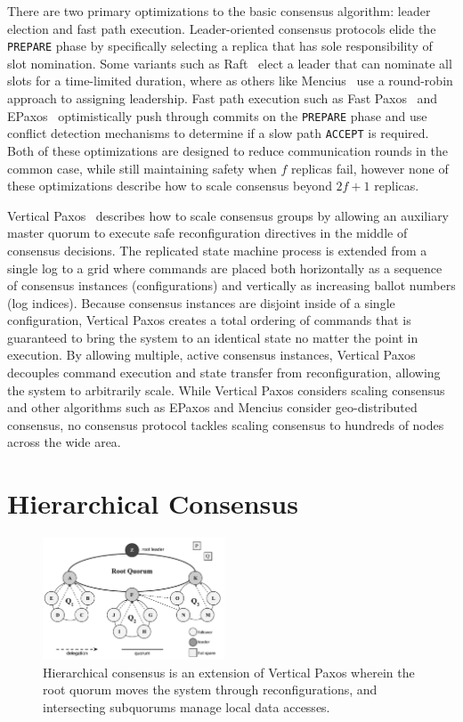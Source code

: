 \documentclass[10pt,conference]{IEEEtran}
\newcommand{\Hc}{Hierarchical consensus\xspace}
\newcommand{\sub}{subquorum\xspace}
\newcommand{\subs}{subquorums\xspace}
\newcommand{\roo}{root quorum\xspace}
\begin{document}
There are two primary optimizations to the basic consensus algorithm: leader election
and fast path execution.
Leader-oriented consensus protocols elide the \texttt{PREPARE} phase by specifically
selecting a replica that has sole responsibility of slot nomination.
Some variants such as Raft~\cite{raft} elect a leader that can nominate all slots for
a time-limited duration, where as others like Mencius~\cite{mencius} use a round-robin
approach to assigning leadership.
Fast path execution such as Fast Paxos~\cite{fast_paxos} and EPaxos~\cite{epaxos}
optimistically push through commits on the \texttt{PREPARE} phase and use conflict
detection mechanisms to determine if a slow path \texttt{ACCEPT} is required.
Both of these optimizations are designed to reduce communication rounds in the common
case, while still maintaining safety when $f$ replicas fail, however none of these
optimizations describe how to scale consensus beyond $2f+1$ replicas.

Vertical Paxos~\cite{vertical_paxos,niobe} describes how to scale consensus groups by
allowing an auxiliary master quorum to execute safe reconfiguration directives in the
middle of consensus decisions.
The replicated state machine process is extended from a single log to a grid where
commands are placed both horizontally as a sequence of consensus instances
(configurations) and vertically as increasing ballot numbers (log indices).
Because consensus instances are disjoint inside of a single configuration, Vertical
Paxos creates a total ordering of commands that is guaranteed to bring the system to
an identical state no matter the point in execution.
By allowing multiple, active consensus instances, Vertical Paxos decouples command
execution and state transfer from reconfiguration, allowing the system to arbitrarily
scale.
While Vertical Paxos considers scaling consensus and other algorithms such as EPaxos and
Mencius consider geo-distributed consensus, no consensus protocol tackles scaling
consensus to hundreds of nodes across the wide area.

\section{Hierarchical Consensus}
\label{section:hc}


\begin{figure}[t]
    \centering
    \includegraphics[width=0.48\textwidth]{figures/election3}
    \caption{\Hc is an extension of Vertical Paxos wherein the \roo moves the system
    through reconfigurations, and intersecting \subs manage local data accesses.}
    \label{fig:system}
\end{figure}
\end{document}
